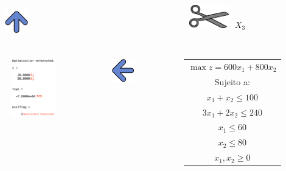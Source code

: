 \documentclass{beamer}
\begin{document}
\begin{frame}
\begin{columns}
		\begin{column}{4cm}
			\only<4->
			{		
				\centering
				\includegraphics[width=1cm,height=1.5cm]{seta_azul_cima.jpg}		
			}
		\end{column}
		\begin{column}{3cm}
		\end{column}
		\begin{column}{4cm}
			\only<3->
			{		
				\centering
				\includegraphics[width=2cm,height=1cm]{tesoura.png} {\color{red}$X_3$}
			}
		\end{column}
	\end{columns}
	\begin{columns}
		\begin{column}{4cm}
			\only<4->
			{		
				\centering
				\includegraphics[width=2.5cm,height=2.5cm]{Elimina_Matlab_2.png}
			}
		\end{column} 
		\begin{column}{3cm}
			\only<4->
			{		
				\centering
				\includegraphics[width=1.5cm,height=1cm]{seta_azul_esquerda.jpg} \\		
			}
		\end{column}
		\begin{column}{4cm}
			\only<3->
			{		
				\centering
				\scriptsize
				\begin{table}
					\begin{tabular}{c}
						\cellcolor{olive!50} $ \max z = 600x_1 + 800x_2 $\\
						\cellcolor{olive!50} Sujeito a: \\
						\cellcolor{olive!50} $x_1 + x_2 \le 100$ \\
						\cellcolor{olive!50} $3x_1 + 2x_2 \le 240$ \\
						\cellcolor{olive!50} $x_1 \le 60 $ \\
						\cellcolor{olive!50} $x_2 \le 80 $ \\
					    \cellcolor{olive!50} $x_1, x_2 \ge 0 $ \\
					\end{tabular}
				\end{table}
			}
		\end{column} 
	\end{columns}	
\end{frame}
\end{document}
